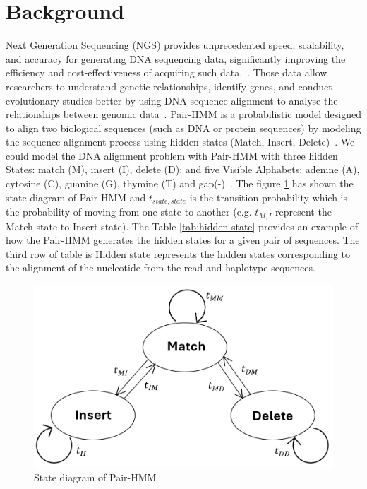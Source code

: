 \documentclass[PhD]{PHlab-thesis}
\begin{document}
\section{Background}
Next Generation Sequencing (NGS) provides unprecedented speed, scalability, and accuracy for generating DNA sequencing data, significantly improving the efficiency and cost-effectiveness of acquiring such data.~\cite{NGS,NGS2}. Those data allow researchers to understand genetic relationships, identify genes, and conduct evolutionary studies better by using DNA sequence alignment to analyse the relationships between genomic data~\cite{NGS3,NGS4}. \newline
Pair-HMM is a probabilistic model designed to align two biological sequences (such as DNA or protein sequences) by modeling the sequence alignment process using hidden states (Match, Insert, Delete)~\cite{HMM,PHMM,RHMM}. We could model the DNA alignment problem with Pair-HMM with three hidden States: match (M), insert (I), delete (D); and five Visible Alphabets: adenine (A), cytosine (C), guanine (G), thymine (T) and gap(-)~\cite{EnliangLi}. The figure \ref{fig:state diagram} has shown the state diagram of Pair-HMM and \textit{$t_{state,state}$} is the transition probability which is the probability of moving from one state to another (e.g. \textit{$t_{M,I}$} represent the Match state to Insert state). The Table \ref{tab:hidden state} provides an example of how the Pair-HMM generates the hidden states for a given pair of sequences. The third row of table is Hidden state represents the hidden states corresponding to the alignment of the nucleotide from the read and haplotype sequences.
\begin{figure}[h]
    \centering
    \includegraphics[width=0.7\linewidth]{figure/state.png}
    \caption{State diagram of Pair-HMM}
    \label{fig:state diagram}
\end{figure}
\end{document}

